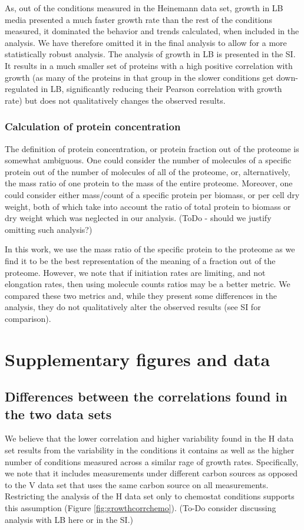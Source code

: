 \documentclass[notitlepage]{article}
\begin{document}
As, out of the conditions measured in the Heinemann data set, growth in LB media presented a much faster growth rate than the rest of the conditions measured, it dominated the behavior and trends calculated, when included in the analysis.
We have therefore omitted it in the final analysis to allow for a more statistically robust analysis.
The analysis of growth in LB is presented in the SI.
It results in a much smaller set of proteins with a high positive correlation with growth (as many of the proteins in that group in the slower conditions get down-regulated in LB, significantly reducing their Pearson correlation with growth rate) but does not qualitatively changes the observed results.

\subsubsection{Calculation of protein concentration}
\label{protconc}
The definition of protein concentration, or protein fraction out of the proteome is somewhat ambiguous.
One could consider the number of molecules of a specific protein out of the number of molecules of all of the proteome, or, alternatively, the mass ratio of one protein to the mass of the entire proteome.
Moreover, one could consider either mass/count of a specific protein per biomass, or per cell dry weight, both of which take into account the ratio of total protein to biomass or dry weight which was neglected in our analysis.
(ToDo - should we justify omitting such analysis?)

In this work, we use the mass ratio of the specific protein to the proteome as we find it to be the best representation of the meaning of a fraction out of the proteome.
However, we note that if initiation rates are limiting, and not elongation rates, then using molecule counts ratios may be a better metric.
We compared these two metrics and, while they present some differences in the analysis, they do not qualitatively alter the observed results (see SI for comparison).

\section{Supplementary figures and data}
\subsection{Differences between the correlations found in the two data sets}
\label{heinemannchemo}
We believe that the lower correlation and higher variability found in the H data set results from the variability in the conditions it contains as well as the higher number of conditions measured across a similar rage of growth rates.
Specifically, we note that it includes measurements under different carbon sources as opposed to the V data set that uses the same carbon source on all measurements.
Restricting the analysis of the H data set only to chemostat conditions supports this assumption (Figure \ref{fig:growthcorrchemo}).
(To-Do consider discussing analysis with LB here or in the SI.)
\end{document}
